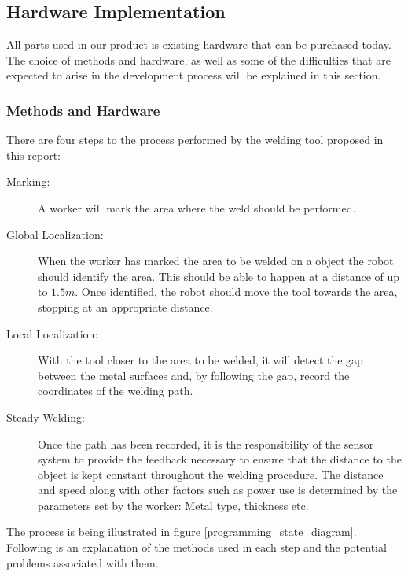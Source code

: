\subsection{Hardware Implementation}
All parts used in our product is existing hardware that can be purchased today.
The choice of methods and hardware, as well as some of the difficulties that are expected to arise in the development process will be explained in this section.
\subsubsection{Methods and Hardware}
There are four steps to the process performed by the welding tool proposed in this report:
\begin{description}
	\item[Marking:            ] A worker will mark the area where the weld should be performed.
	\item[Global Localization:] When the worker has marked the area to be welded on a object the robot should identify the area. This should be able to happen at a distance of up to $1.5m$. Once identified, the robot should move the tool towards the area, stopping at an appropriate distance.
	\item[Local Localization: ] With the tool closer to the area to be welded, it will detect the gap between the metal surfaces and, by following the gap, record the coordinates of the welding path.
	\item[Steady Welding:     ] Once the path has been recorded, it is the responsibility of the sensor system to provide the feedback necessary to ensure that the distance to the object is kept constant throughout the welding procedure. The distance and speed along with other factors such as power use is determined by the parameters set by the worker: Metal type, thickness etc.
\end{description}
The process is being illustrated in figure \ref{programming_state_diagram}. Following is an explanation of the methods used in each step and the potential problems associated with them.


